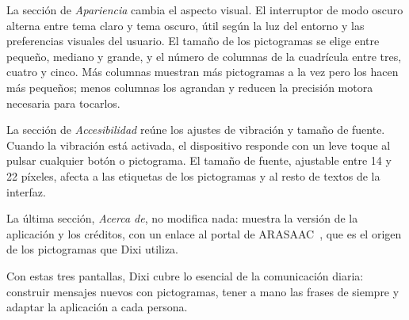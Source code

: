 La sección de \textit{Apariencia} cambia el aspecto visual. El interruptor de modo oscuro alterna entre tema claro y tema oscuro, útil según la luz del entorno y las preferencias visuales del usuario. El tamaño de los pictogramas se elige entre pequeño, mediano y grande, y el número de columnas de la cuadrícula entre tres, cuatro y cinco. Más columnas muestran más pictogramas a la vez pero los hacen más pequeños; menos columnas los agrandan y reducen la precisión motora necesaria para tocarlos.

La sección de \textit{Accesibilidad} reúne los ajustes de vibración y tamaño de fuente. Cuando la vibración está activada, el dispositivo responde con un leve toque al pulsar cualquier botón o pictograma. El tamaño de fuente, ajustable entre 14 y 22 píxeles, afecta a las etiquetas de los pictogramas y al resto de textos de la interfaz.

La última sección, \textit{Acerca de}, no modifica nada: muestra la versión de la aplicación y los créditos, con un enlace al portal de ARASAAC~\cite{arasaac}, que es el origen de los pictogramas que Dixi utiliza.

Con estas tres pantallas, Dixi cubre lo esencial de la comunicación diaria: construir mensajes nuevos con pictogramas, tener a mano las frases de siempre y adaptar la aplicación a cada persona.
